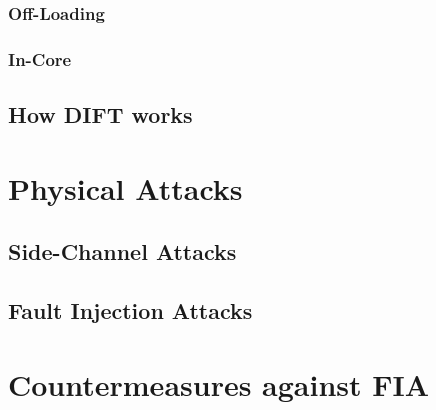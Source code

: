 \subsubsection{Off-Loading}

\subsubsection{In-Core}

\subsection{How DIFT works}

\section{Physical Attacks}
\label{section:physicalAttacks}

\subsection{Side-Channel Attacks}
\subsection{Fault Injection Attacks}


\section{Countermeasures against FIA}
\label{section:countermeasuresAgainstFIA}

